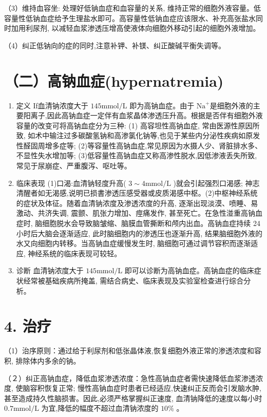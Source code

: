 \documentclass[10pt]{article}
\begin{document}
（3）维持血容坐: 处理好低钠血症和血容量的关系, 维持正常的细胞外液容量。低容量性低钠血症给予生理盐水即可。高容量性低钠血症应该限水、补充高张盐水同时加用利尿剂, 以减轻血浆渗透压增高使液体向细胞外移动引起的细胞外液增加。

（4）纠正低钠向的症的同时,注意补钾、补镁、纠正酸碱平衡失调等。

\section*{（二）高钠血症(hypernatremia)}
\begin{enumerate}
  \item 定义 If血清钠浓度大于 $145 \mathrm{mmol} / \mathrm{L}$ 即为高钠血症。由于 $\mathrm{Na}^{+}$是细胞外液的主要阳离子,因此高钠血症一定伴有血浆晶体渗透压升高。根据是否伴有细胞外液容量的改变可将高钠血症分为三种: (1) 高容坦性高钠血症, 常由医源性原因所致, 如术中输注过多碳酸氢钠和高渗氯化钠等,也见于某些内分泌性疾病如原发性醛固周增多症等; (2)等容量性高钠血症,常见原因为水摄人少、肾脏排水多、不显性失水增加等; (3)低容量性高钠血症又称高渗性脱水,因低渗液丢失所致, 常见于尿崩症、严重腹泻、呕吐等。

  \item 临床表现 (1)口渴:血清钠轻度升高( $3 \sim 4 \mathrm{mmol} / \mathrm{L}$ )就会引起强烈口渴感; 神志清醒者如无渴感,说明已损書渗透压感受器或皮质渴感中枢。(2)中枢神经系统的症状及体征。随着血清钠浓度及渗透浓度的升高, 逐渐出现淡漠、喷睡、易激动、共济失调, 震颤、肌张力增加、痙痛发作, 甚至死亡。在急性湴重高钠血症时, 脑细胞脱水会导致脑皱缩、脑膜血管撕断和颅内出血。高钠血症持续 24 小时后大脑会逐渐适应, 此时脑细胞内的渗透压也逐渐升高, 结果脑细胞外液的水又向细胞内转移。当高钠血症缓慢发生时, 脑细胞可通过调节容积而逐渐适应, 神经系统的临床表现可较轻。

  \item 诊断 血清钠浓度大于 $145 \mathrm{mmol} / \mathrm{L}$ 即可以诊断为高钠血症。高钠血症的临床症状经常被基础疾病所掩盖, 需结合病史、临床表现及实验室检查进行综合分析。

\end{enumerate}

\section*{4. 治疗}
（1）治序原则：通过给于利尿剂和低张晶体液,恢复细胞外液正常的渗透浓度和容积, 排除体内多余的钠。

（２）纠正高钠血症，降低血浆渗透浓度：急性高钠血症者需快速降低血浆渗透浓度, 使脑容积恢复正常; 慢性高钠血症时患者已经适应,快速纠正反而会引发脑水肿,甚至造成持久性脑损害。因此,必须严格掌握纠正速度, 血清钠降低的速度以每小时 $0.7 \mathrm{mmol} / \mathrm{L}$ 为宜,降低的幅度不超过血清钠浓度的 $10 \%$ 。
\end{document}
